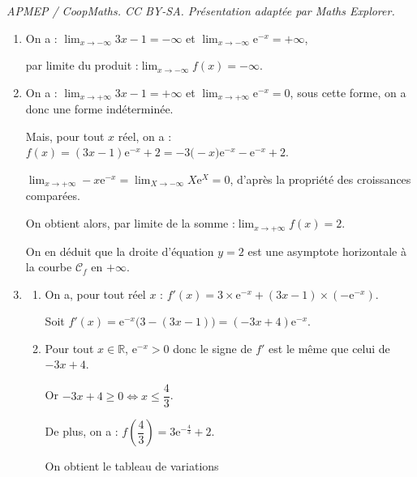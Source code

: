 \documentclass[10pt]{article}
\providecommand{\R}{\mathbb{R}}
\providecommand{\e}{{\mathrm{e}}}
\begin{document}
\noindent\textit{APMEP / CoopMaths. CC BY-SA. Présentation adaptée par Maths Explorer.}\par\medskip
\begin{enumerate}
		\item On a :\quad
		$\displaystyle \lim_{x \to -\infty} 3x-1 = - \infty$
		\quad et \quad
		$\displaystyle \lim_{x \to -\infty} \e^{-x} = + \infty$,

		par limite du produit :\quad $\displaystyle \lim_{x \to -\infty} f(x) = - \infty$.

		\item On a :\quad
		$\displaystyle \lim_{x \to +\infty} 3x-1 = + \infty$
		\quad et \quad
		$\displaystyle \lim_{x \to +\infty} \e^{-x} = 0$, \quad sous cette forme, on a donc une forme indéterminée.

		Mais, pour tout $x$ réel, on a :\quad $f(x) = (3x- 1)\e^{-x} +2 =  -3 \big(-x \big)\e^{-x} - \e^{-x} +2$.


		$\displaystyle  \lim_{x \to +\infty} -x \e^{-x} = \displaystyle  \lim_{X \to -\infty} X \e^{X} = 0  $, \quad d'après la propriété des croissances comparées.

		On obtient alors, par limite de la somme :\quad $\displaystyle  \lim_{x \to +\infty} f(x) =2$.

		On en déduit que la droite d'équation $y=2$ est une asymptote horizontale à la courbe $\mathcal{C}_f$ en $+\infty$.

		\item \begin{enumerate}
			\item On a, pour tout réel $x$ : \quad $f'(x)=3 \times \e^{-x} + (3x-1) \times \left( - \e^{-x} \right)$.

			Soit \quad $f'(x)=\e^{-x} \big( 3-(3x-1) \big)=(-3x+4) \e^{-x}$.

			\item Pour tout $x \in \R$, \quad $\e^{-x} >0$ \quad donc le signe de $f'$ est le même que celui de $-3x+4$.

			Or \quad $-3x+4 \geqslant 0 \iff x \leqslant \dfrac43$.

			De plus, on a : \quad $f \left(\dfrac43 \right) = 3 \e^{-\frac43}+2$.

			On obtient le tableau de variations
			\begin{center}
			\end{center}
		\end{enumerate}


\end{enumerate}
\end{document}
